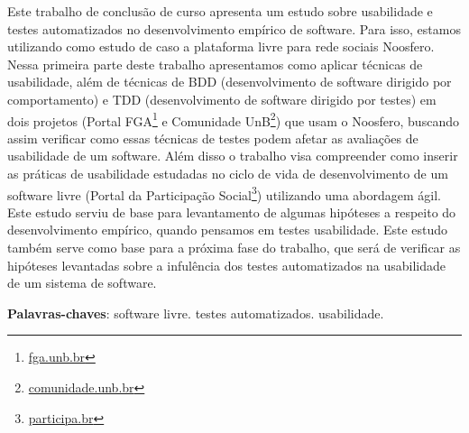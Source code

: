 \begin{resumo}

Este trabalho de conclusão de curso apresenta um estudo sobre usabilidade e testes automatizados no desenvolvimento empírico de software. Para isso, estamos utilizando como estudo de caso a plataforma livre para rede sociais Noosfero. Nessa primeira parte deste trabalho apresentamos como aplicar técnicas de usabilidade, além de técnicas de BDD (desenvolvimento de software dirigido por comportamento) e TDD (desenvolvimento de software dirigido por testes) em dois projetos (Portal FGA\footnote{\url{fga.unb.br}} e Comunidade UnB\footnote{\url{comunidade.unb.br}}) que usam o Noosfero, buscando assim verificar como essas técnicas de testes podem afetar as avaliações de usabilidade de um software.  Além disso o trabalho visa compreender como inserir as práticas de usabilidade estudadas no ciclo de vida de desenvolvimento de um software livre (Portal da Participação Social\footnote{\url{participa.br}}) utilizando uma abordagem ágil. 
Este estudo serviu de base para levantamento de algumas hipóteses a respeito do desenvolvimento empírico, quando pensamos em testes usabilidade. Este estudo também serve como base para a próxima fase do trabalho, que será de verificar as hipóteses levantadas sobre a infulência dos testes automatizados na usabilidade de um sistema de software.



\vspace{\onelineskip}
    
 \noindent
 \textbf{Palavras-chaves}: software livre. testes automatizados. usabilidade.

\end{resumo}
